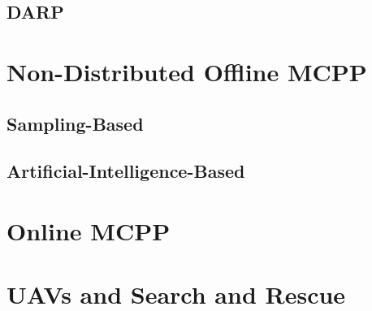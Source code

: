 	
	\subsection{DARP}
\section{Non-Distributed Offline MCPP}
\subsection{Sampling-Based}
\subsection{Artificial-Intelligence-Based}

\section{Online MCPP}
\section{UAVs and Search and Rescue}



